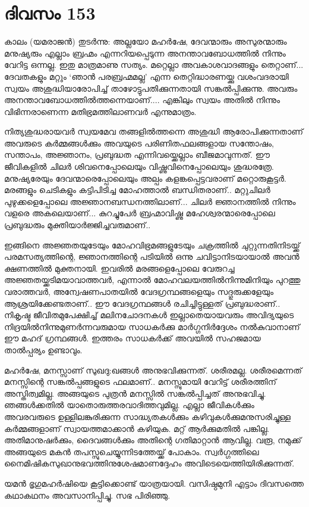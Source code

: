 \section{ദിവസം 153}


കാലം (യമരാജന്‍) തുടർന്നു: അല്ലയോ മഹർഷേ, ദേവന്മാരും അസുരന്മാരും മനുഷ്യരും എല്ലാം ബ്രഹ്മം എന്നറിയപ്പെടുന്ന അനന്താവബോധത്തിൽ നിന്നും വേറിട്ട ഒന്നല്ല. ഇതു മാത്രമാണു സത്യം. മറ്റെല്ലാ അവകാശവാദങ്ങളും തെറ്റാണ്‌...  ദേവതകളും മറ്റും ‘ഞാൻ പരബ്രഹ്മമല്ല’ എന്ന  തെറ്റിദ്ധാരണയ്ക്കു വശംവദരായി സ്വയം അശുദ്ധിയാരോപിച്ച് താഴോട്ടുപതിക്കുന്നതായി സങ്കൽപ്പിക്കുന്നു. അവരും അനന്താവബോധത്തിൽത്തന്നെയാണ്‌.... എങ്കിലും സ്വയം അതില്‍ നിന്നും വിഭിന്നരാണെന്ന മതിഭ്രമത്തിലാണവർ എന്നുമാത്രം.

നിത്യശുദ്ധരായവർ സ്വയമേവ തങ്ങളിൽത്തന്നെ അശുദ്ധി ആരോപിക്കുന്നതാണ്‌ അവരുടെ കർമ്മങ്ങൾക്കും അവയുടെ പരിണിതഫലങ്ങളായ സന്തോഷം, സന്താപം, അജ്ഞാനം, പ്രബുദ്ധത എന്നിവയ്ക്കെല്ലാം ബീജമാവുന്നത്. ഈ ജീവികളിൽ ചിലർ ശിവനെപ്പോലെയും വിഷ്ണുവിനെപ്പോലെയും ശുദ്ധരത്രേ. മനുഷ്യരേയും ദേവന്മാരെപ്പോലെയും അല്പം കളങ്കപ്പെട്ടവരാണ്  മറ്റൊരുകൂട്ടർ. മരങ്ങളും ചെടികളും കട്ടിപിടിച്ച മോഹത്താൽ ബന്ധിതരാണ്‌.. മറ്റുചിലർ പുഴുക്കളെപ്പോലെ അജ്ഞാനബന്ധനത്തിലാണ്‌...  ചിലർ ജ്ഞാനത്തിൽ നിന്നും വളരെ അകലെയാണ്‌...   കുറച്ചുപേർ ബ്രഹ്മാവിഷ്ണു മഹേശ്വരന്മാരെപ്പോലെ പ്രബുദ്ധരും മുക്തിയാർജ്ജിച്ചവരുമാണ്‌..

ഇങ്ങിനെ അജ്ഞതയുടേയും മോഹവിഭ്രമങ്ങളുടേയും ചക്രത്തിൽ ചുറ്റുന്നതിനിടയ്ക്ക് പരമസത്യത്തിന്റെ, ജ്ഞാനത്തിന്റെ പടിയിൽ ഒന്നു ചവിട്ടാനിടയായാൽ അവൻ ക്ഷണത്തിൽ മുക്തനായി. ഇവരിൽ മരങ്ങളെപ്പോലെ വേരുറച്ച അജ്ഞതയ്ക്കടിമയാവാത്തവർ, എന്നാൽ മോഹവലയത്തിൽനിന്നുമിനിയും പുറത്തു വരാത്തവർ, അന്വേഷണപാതയിൽ വേദഗ്രന്ഥങ്ങളെയും സദ്ഗുരുക്കളേയും ആശ്രയിക്കേണ്ടതാണ്‌..  ഈ വേദഗ്രന്ഥങ്ങൾ രചിച്ചിട്ടുള്ളത് പ്രബുദ്ധരാണ്‌..  നികൃഷ്ട ജീവിതമുപേക്ഷിച്ച് മലിനചോദനകൾ ഇല്ലാതെയായവരും അവിദ്യയുടെ നിദ്രയിൽനിന്നുമുണർന്നവരുമായ സാധകർക്കു മാർഗ്ഗനിർദ്ദേശം നൽകുവാനാണ്‌ ഈ മഹദ് ഗ്രന്ഥങ്ങൾ. ഇത്തരം സാധകർക്ക് അവയിൽ സഹജമായ താൽപ്പര്യം ഉണ്ടാവും.

മഹർഷേ, മനസ്സാണ്‌ സുഖദു:ഖങ്ങൾ അനുഭവിക്കുന്നത്. ശരീരമല്ല. ശരീരമെന്നത് മനസ്സിന്റെ സങ്കൽപ്പങ്ങളുടെ ഫലമാണ്‌..  മനസ്സുമായി വേറിട്ട് ശരീരത്തിന്‌ അസ്തിത്വമില്ല. അങ്ങയുടെ പുത്രൻ മനസ്സിൽ സങ്കൽപ്പിച്ചത് അനുഭവിച്ചു. ഞങ്ങൾക്കതിൽ യാതൊരുത്തരവാദിത്തവുമില്ല. എല്ലാ ജീവികൾക്കും അവരവരുടെ ഉള്ളിലങ്കുരിക്കുന്ന സാദ്ധ്യതകൾക്കും കഴിവുകൾക്കുമനുസരിച്ചുള്ള കർമ്മങ്ങളാണ്‌ സ്വായത്തമാക്കാൻ കഴിയുക. മറ്റ് ആർക്കുമതിൽ പങ്കില്ല. അതിമാനുഷർക്കും, ദൈവങ്ങൾക്കും അതിന്റെ ഗതിമാറ്റാൻ ആവില്ല. വരൂ, നമുക്ക് അങ്ങയുടെ മകൻ തപസ്സുചെയ്യുന്നിടത്തേയ്ക്ക് പോകാം. സ്വർഗ്ഗത്തിലെ നൈമിഷികസുഖാനുഭവത്തിനുശേഷമാണദ്ദേഹം അവിടെയെത്തിയിരിക്കുന്നത്.

യമൻ ഭൃഗുമഹർഷിയെ കൂട്ടിക്കൊണ്ട് യാത്രയായി. വസിഷ്ഠമുനി എട്ടാം ദിവസത്തെ കഥാകഥനം അവസാനിപ്പിച്ചു. സഭ പിരിഞ്ഞു. 

